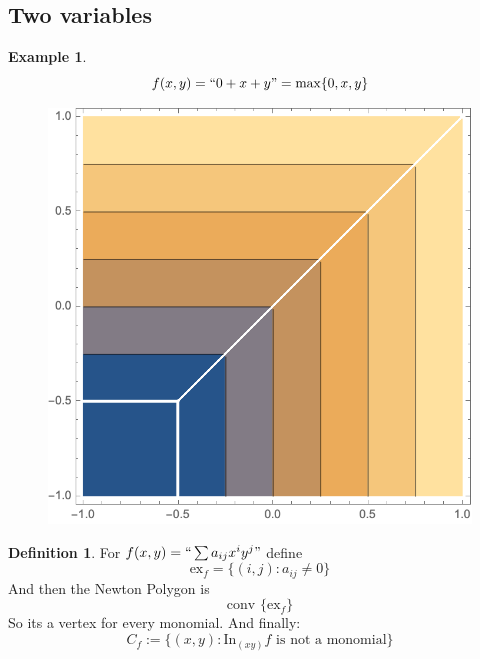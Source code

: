 \documentclass{article}
\theoremstyle{definition}
\newtheorem*{defn}{Definition}
\newtheorem{ex}{Example}
\newcommand{\Ex}{\text{ex}}
\newcommand{\conv}{\text{conv }}
\newcommand{\In}{\text{In}}
\begin{document}
\subsection{Two variables}
\begin{ex}
	$$f(x,y)=``0+x+y"=\max\{0,x,y\}$$
	\begin{figure}[H]
		\centering
		\includegraphics[width=0.4\linewidth]{7}
		\caption*{}
		\label{fig:7}
	\end{figure}
\end{ex}
\begin{defn}
	For $f(x,y)=``\sum a_{ij}x^iy^j"$ define $$\Ex_f=\{(i,j):a_{ij}\neq0\}$$
	And then the Newton Polygon is $$\conv\{\Ex_f\}$$ So its a vertex for every monomial. And finally: $$C_f:=\{(x,y):\In_{(xy)}f \text{ is not a monomial}\}$$
\end{defn}
\end{document}
